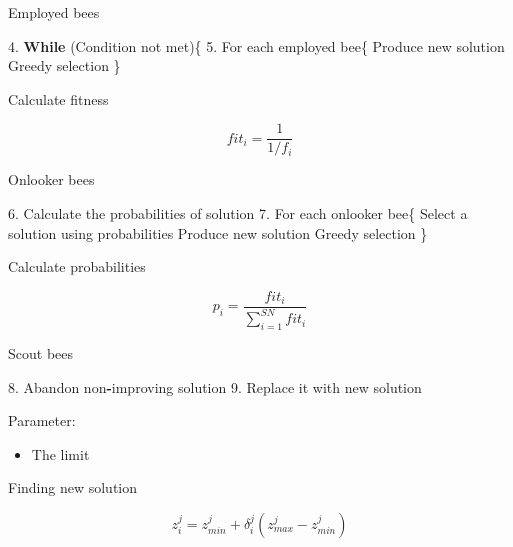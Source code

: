 \documentclass[14pt,ignorenonframetext,compress]{beamer}
\newenvironment{Shaded}{\begin{snugshade}}{\end{snugshade}}
\newcommand{\FloatTok}[1]{\textcolor[rgb]{0.00,0.00,0.81}{#1}}
\newcommand{\KeywordTok}[1]{\textcolor[rgb]{0.13,0.29,0.53}{\textbf{#1}}}
\newcommand{\NormalTok}[1]{#1}
\newcommand{\OperatorTok}[1]{\textcolor[rgb]{0.81,0.36,0.00}{\textbf{#1}}}
\providecommand{\tightlist}{%
  \setlength{\itemsep}{0pt}\setlength{\parskip}{0pt}}
\renewenvironment{Shaded}{\color{black}\begin{snugshade}\color{black}}{\end{snugshade}}
\begin{document}
\begin{frame}[fragile]{Employed bees}
\protect\hypertarget{employed-bees-1}{}

\begin{Shaded}
\begin{Highlighting}[]
 \FloatTok{4.} \KeywordTok{While}\NormalTok{ (Condition not met)\{}
 \FloatTok{5.}\NormalTok{ For each employed bee\{}
\NormalTok{     Produce new solution }
\NormalTok{     Greedy selection \}}
\end{Highlighting}
\end{Shaded}

\begin{block}{Calculate fitness}

\[fit_i = \frac{1}{1/f_i}\]

\end{block}

\end{frame}

\begin{frame}[fragile]{Onlooker bees}
\protect\hypertarget{onlooker-bees}{}

\begin{Shaded}
\begin{Highlighting}[]
 \FloatTok{6.}\NormalTok{ Calculate the probabilities of solution}
 \FloatTok{7.}\NormalTok{ For each onlooker bee\{  }
\NormalTok{     Select a solution using probabilities}
\NormalTok{     Produce new solution}
\NormalTok{     Greedy selection \}}
          
\end{Highlighting}
\end{Shaded}

\begin{block}{Calculate probabilities}

\[p_i = \frac{fit_i}{\sum^{SN}_{i=1} fit_i}\]

\end{block}

\end{frame}

\begin{frame}[fragile]{Scout bees}
\protect\hypertarget{scout-bees}{}

\begin{Shaded}
\begin{Highlighting}[]
 \FloatTok{8.}\NormalTok{ Abandon non}\OperatorTok{-}\NormalTok{improving solution }
 \FloatTok{9.}\NormalTok{ Replace it with new solution}
\end{Highlighting}
\end{Shaded}

Parameter:

\begin{itemize}
\tightlist
\item
  The limit
\end{itemize}

\pause

\begin{block}{Finding new solution}

\[z_i^j = z_{min}^j + \delta_i^j(z_{max}^j-z_{min}^j)\]

\end{block}

\end{frame}
\end{document}
